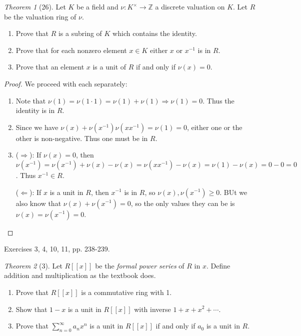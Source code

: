 \documentclass[12pt]{article}
\theoremstyle{remark}
\theoremstyle{named}
\newtheorem*{theorem}{Theorem}
\newcommand{\Z}{\mathbb Z}
\begin{document}
\begin{theorem}[26]
    Let \(K\) be a field and \(\nu : K^\times \to \Z\) a discrete valuation on \(K\). Let \(R\) be the valuation ring of \(\nu\).
    \begin{enumerate}
        \item Prove that \(R\) is a subring of \(K\) which contains the identity.
        \item Prove that for each nonzero element \(x \in K\) either \(x\) or \(x^{-1}\) is in \(R\). 
        \item Prove that an element \(x\) is a unit of \(R\) if and only if \(\nu(x) = 0\).
    \end{enumerate}
\end{theorem}

\begin{proof}
    We proceed with each separately:
    \begin{enumerate}
        \item Note that $\nu(1) = \nu(1 \cdot 1) = \nu(1) + \nu(1) \Rightarrow \nu(1) = 0$. Thus the identity is in $R$.
        \item Since we have $\nu(x) + \nu(x^{-1})\nu(xx^{-1}) = \nu(1) = 0$, either one or the other is non-negative. Thus one must be in $R$.
        \item ($\Rightarrow$): If $\nu(x) = 0$, then $\nu(x^{-1}) = \nu(x^{-1}) + \nu(x) - \nu(x) = \nu(xx^{-1}) - \nu(x) = \nu(1) - \nu(x) = 0 - 0 = 0$. Thus $x^{-1} \in R$.
        
        ($\Leftarrow$): If $x$ is a unit in $R$, then $x^{-1}$ is in $R$, so $\nu(x), \nu(x^{-1}) \ge 0$. BUt we also know that $\nu(x) + \nu(x^{-1}) = 0$, so the only values they can be is $\nu(x) = \nu(x^{-1}) = 0$.
    \end{enumerate}
\end{proof}

Exercises 3, 4, 10, 11, pp. 238-239.

\begin{theorem}[3]
    Let \(R[[x]]\) be the \textit{formal power series} of \(R\) in \(x\). Define addition and multiplication as the textbook does.
    \begin{enumerate}
        \item Prove that \(R[[x]]\) is a commutative ring with 1.
        \item Show that \(1 - x\) is a unit in \(R[[x]]\) with inverse \(1 + x + x^2 + \cdots\).
        \item Prove that \(\sum_{n = 0}^\infty a_n x^n\) is a unit in \(R[[x]]\) if and only if \(a_0\) is a unit in \(R\).
    \end{enumerate}
\end{theorem}
\end{document}
